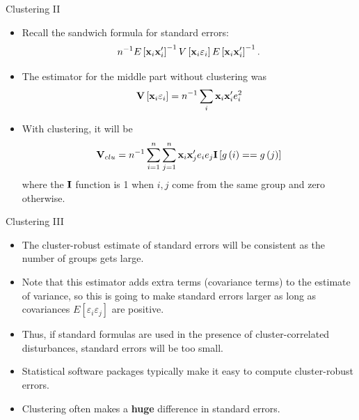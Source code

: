 \begin{frame}{Clustering II}
\begin{itemize}
	\item Recall the sandwich formula for standard errors:\[
		n^{-1} E\left[{\bf x}_i {\bf x}'_i\right]^{-1} V\left[{\bf x}_i \varepsilon_i \right] E\left[{\bf x}_i {\bf x}'_i\right]^{-1}.
	\]

	\item The estimator for the middle part without clustering was\[
	{\bf V}\left[{\bf x}_i \varepsilon_i \right] = n^{-1} \sum_{i} {\bf x}_i {\bf x}'_i  e_i^2
	\]

	\item With clustering, it will be \[
	{\bf V}_{clu} = n^{-1} \sum_{i=1}^{n}\sum_{j=1}^{n} {\bf x}_i {\bf x}'_j e_i e_j {\bf I}\left[g\left(i\right)==g\left(j\right)\right]
	\]
	where the ${\bf I}$ function is 1 when $i,j$ come from the same group and zero otherwise.

\end{itemize}
\end{frame}


\begin{frame}{Clustering III}
\begin{itemize}
	\item The cluster-robust estimate of standard errors will be consistent as the number of groups 
	gets large.

	\item Note that this estimator adds extra terms (covariance terms) to the estimate of variance,
	so this is going to make standard errors larger as long as covariances $E\left[\varepsilon_i \varepsilon_j\right]$ are positive. 

	\item Thus, if standard formulas are used in the presence of cluster-correlated disturbances, 
	standard errors will be too small.

	\item Statistical software packages typically make it easy to compute cluster-robust errors.
	
	\item Clustering often makes a {\bf huge} difference in standard errors.

\end{itemize}
\end{frame}

